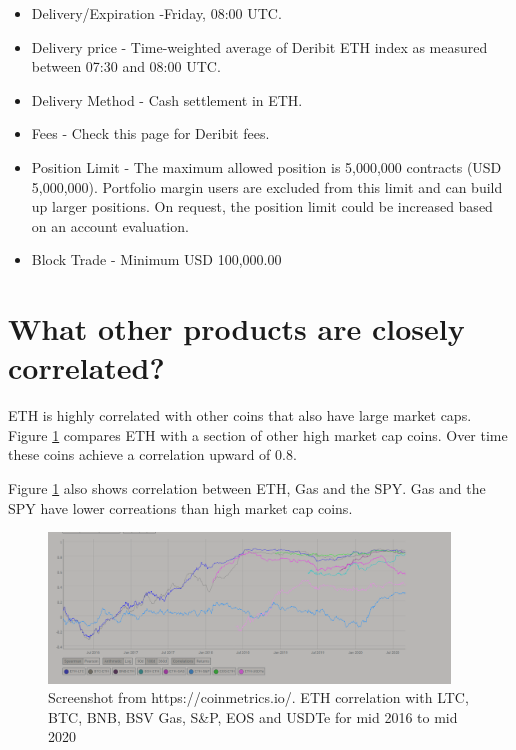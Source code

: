 \begin{itemize}
\item Delivery/Expiration -Friday, 08:00 UTC.

\item Delivery price - Time-weighted average of Deribit ETH index as measured between 07:30 and 08:00 UTC.

\item Delivery Method - Cash settlement in ETH.

\item Fees - Check this page for Deribit fees.

\item Position Limit - The maximum allowed position is 5,000,000 contracts (USD 5,000,000). Portfolio margin users are excluded from this limit and can build up larger positions. On request, the position limit could be increased based on an account evaluation.

\item Block Trade - Minimum USD 100,000.00


\end{itemize}




























\section{ What other products are closely correlated?}
ETH is highly correlated with other coins that also have large market caps. Figure \ref{fig:corr} compares ETH with a section of other high market cap coins. Over time these coins achieve a correlation upward of 0.8.

Figure \ref{fig:corr} also shows correlation between ETH, Gas and the SPY. Gas and the SPY have lower correations than high market cap coins.
\begin{figure}\label{fig:corr}
\center
\includegraphics[width=0.95\textwidth]{fig/corrlations.png}
\caption{Screenshot from https://coinmetrics.io/. ETH correlation with LTC, BTC, BNB, BSV Gas, S\&P, EOS and USDTe for mid 2016 to mid 2020}
\end{figure}



